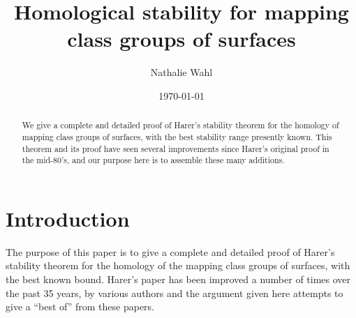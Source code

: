 \documentclass[10pt]{amsart}
\date{\today}
\begin{document}
\setcounter{page}{1}%
%
%    

%    
%    
\title{Homological stability for mapping class groups of surfaces}


%    
%    
\author{Nathalie Wahl}
\address{University of Copenhagen}


%    
%    

\begin{abstract}
We give a complete and detailed proof of Harer's stability theorem for the homology of mapping class groups of
surfaces, with the best stability range presently known. This theorem and its proof have seen several improvements since Harer's
original proof in the mid-80's, and our purpose here is to assemble these many additions. 
\end{abstract}  

\maketitle
\thispagestyle{empty}%
%
%



\section{Introduction}

The purpose of this paper is to give a complete and detailed proof of Harer's stability theorem for the homology of the mapping class
groups of surfaces, with the best known bound.
Harer's paper has been improved a number of times over the past 35 years, by various authors and the argument given here 
attempts to give a ``best of'' from these papers.
\end{document}
